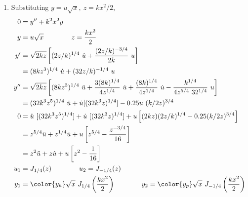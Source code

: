 \begin{enumerate}
    \item Substituting $ y = u\sqrt{x},\ z = kx^2/2 $,
          \begin{align}
              0   & = y'' + k^2x^2 y                                        \\
              y   & = u \sqrt{x} \qquad\qquad z = \frac{kx^2}{2}            \\
              y'  & = \sqrt{2kz} \left[ (2z/k)^{1/4}\ \dot{u}
              + \frac{(2z/k)^{-3/4}}{2k}\ u \right]                         \\
                  & = (8kz^3)^{1/4}\ \dot{u} + (32z/k)^{-1/4}\ u            \\
              y'' & = \sqrt{2kz} \left[ (8kz^3)^{1/4}\ \ddot{u}
                  + \frac{3(8k)^{1/4}}{4z^{1/4}}\ \dot{u}
                  + \frac{(8k)^{1/4}}{4z^{1/4}}\ \dot{u}
              - \frac{k^{1/4}}{4z^{5/4}\ 32^{1/4}}\ u \right]               \\
                  & = (32k^3z^5)^{1/4}\ \ddot{u} + \dot{u} [(32k^3z)^{1/4}]
              - 0.25u\ (k/2z)^{3/4}                                         \\
              0   & = \ddot{u}\ [(32k^3z^5)^{1/4}]
              + \dot{u}\ [(32k^3z)^{1/4}]
              + u \left[(2kz)(2z/k)^{1/4} - 0.25(k/2z)^{3/4} \right]        \\
                  & = z^{5/4} \ddot{u} + z^{1/4}\dot{u}
              + u \left[ z^{5/4} - \frac{z^{-3/4}}{16} \right]              \\
                  & = z^{2} \ddot{u} + z\dot{u}
              + u \left[ z^{2} - \frac{1}{16} \right]                       \\
              u_1 & = J_{1/4}(z) \qquad\qquad u_2 = J_{-1/4}(z)             \\
              y_1 & ={\color{y_h} \sqrt{x}\  J_{1/4}
              \left( \frac{kx^{2}}{2} \right)} \qquad\qquad
              y_2 = {\color{y_p} \sqrt{x}\ J_{-1/4}
              \left( \frac{kx^{2}}{2} \right)}
          \end{align}


\end{enumerate}
